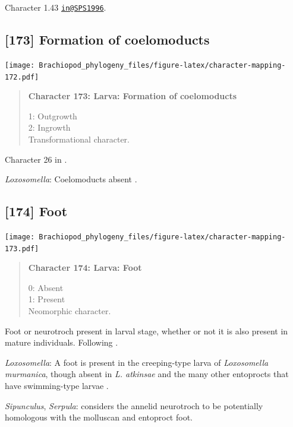 \documentclass[openany]{book}
\begin{document}
Character 1.43 \href{mailto:in@SPS1996}{\nolinkurl{in@SPS1996}}.

\subsection*{{[}173{]} Formation of
coelomoducts}\label{formation-of-coelomoducts}

\texttt{[image: Brachiopod\_phylogeny\_files/figure-latex/character-mapping-172.pdf]}

\begin{quote}
\textbf{Character 173: Larva: Formation of coelomoducts}

1: Outgrowth\\
2: Ingrowth\\
Transformational character.
\end{quote}

Character 26 in \citet{Haszprunar2000}.

\hypertarget{Loxosomella-coding-173}{}
\emph{Loxosomella}: Coelomoducts absent \citep{Haszprunar2000}.

\subsection*{{[}174{]} Foot}\label{foot-1}

\texttt{[image: Brachiopod\_phylogeny\_files/figure-latex/character-mapping-173.pdf]}

\begin{quote}
\textbf{Character 174: Larva: Foot}

0: Absent\\
1: Present\\
Neomorphic character.
\end{quote}

Foot or neurotroch present in larval stage, whether or not it is also
present in mature individuals. Following \citet{Wingstrand1985}.

\hypertarget{Loxosomella-coding-174}{}
\emph{Loxosomella}: A foot is present in the creeping-type larva of
\emph{Loxosomella} \emph{murmanica}, though absent in \emph{L. atkinsae}
and the many other entoprocts that have swimming-type larvae
\citep{Fuchs2008}.

\hypertarget{Serpula-coding-174}{}
\emph{Sipunculus}, \emph{Serpula}: \citet{Wingstrand1985} considers the
annelid neurotroch to be potentially homologous with the molluscan and
entoproct foot.
\end{document}
